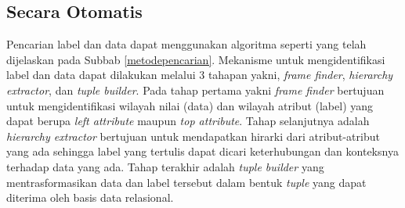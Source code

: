 	\subsection{Secara Otomatis}
	Pencarian label dan data dapat menggunakan algoritma seperti yang telah dijelaskan pada Subbab \ref{metodepencarian}. Mekanisme untuk mengidentifikasi label dan data dapat dilakukan melalui 3 tahapan yakni, \textit{frame finder}, \textit{hierarchy extractor}, dan \textit{tuple builder}. Pada tahap pertama yakni \textit{frame finder} bertujuan untuk mengidentifikasi wilayah nilai (data) dan wilayah atribut (label) yang dapat berupa \textit{left attribute} maupun \textit{top attribute}. Tahap selanjutnya adalah \textit{hierarchy extractor} bertujuan untuk mendapatkan hirarki dari atribut-atribut yang ada sehingga label yang tertulis dapat dicari keterhubungan dan konteksnya terhadap data yang ada. Tahap terakhir adalah \textit{tuple builder} yang mentrasformasikan data dan label tersebut dalam bentuk \textit{tuple} yang dapat diterima oleh basis data relasional.

